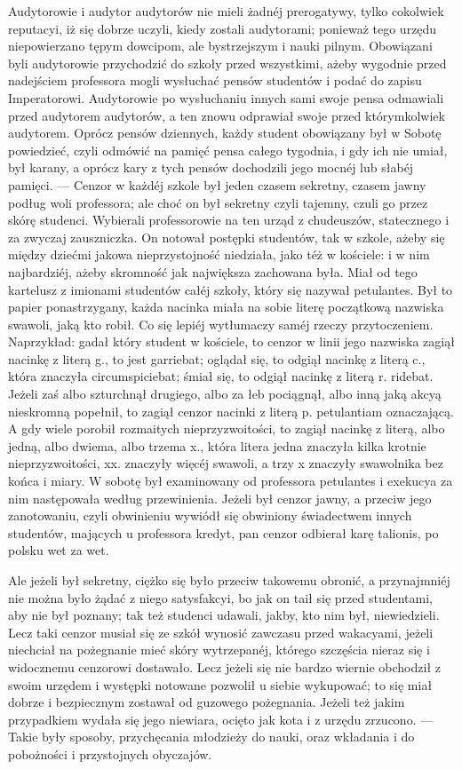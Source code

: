 \documentclass{book}
\begin{document}
Audytorowie i audytor audytorów nie mieli żadnéj prerogatywy, tylko cokolwiek reputacyi, iż się dobrze uczyli, kiedy zostali audytorami; ponieważ tego urzędu niepowierzano tępym dowcipom, ale bystrzejszym i nauki pilnym. Obowiązani byli audytorowie przychodzić do szkoły przed wszystkimi, ażeby wygodnie przed nadejściem professora mogli wysłuchać pensów studentów i podać do zapisu Imperatorowi. Audytorowie po wysłuchaniu innych sami swoje pensa odmawiali przed audytorem audytorów, a ten znowu odprawiał swoje przed którymkolwiek audytorem. Oprócz pensów dziennych, każdy student obowiązany był w Sobotę powiedzieć, czyli odmówić na pamięć pensa całego tygodnia, i gdy ich nie umiał, był karany, a oprócz kary z tych pensów dochodzili jego mocnéj lub słabéj pamięci. — Cenzor w każdéj szkole był jeden czasem sekretny, czasem jawny podług woli professora; ale choć on był sekretny czyli tajemny, czuli go przez skórę studenci. Wybierali professorowie na ten urząd z chudeuszów, statecznego i za zwyczaj zauszniczka. On notował postępki studentów, tak w szkole, ażeby się między dziećmi jakowa nieprzystojność niedziała, jako téż w kościele: i w nim najbardziéj, ażeby skromność jak największa zachowana była. Miał od tego kartelusz z imionami studentów całéj szkoły, który się nazywał petulantes. Był to papier ponastrzygany, każda nacinka miała na sobie literę początkową nazwiska swawoli, jaką kto robił. Co się lepiéj wytłumaczy saméj rzeczy przytoczeniem. Naprzykład: gadał który student w kościele, to cenzor w linii jego nazwiska zagiął nacinkę z literą g., to jest garriebat; oglądał się, to odgiął nacinkę z literą c., która znaczyła circumspiciebat; śmiał się, to odgiął nacinkę z literą r. ridebat. Jeżeli zaś albo szturchnął drugiego, albo za łeb pociągnął, albo inną jaką akcyą nieskromną popełnił, to zagiął cenzor nacinki z literą p. petulantiam oznaczającą. A gdy wiele porobił rozmaitych nieprzyzwoitości, to zagiął nacinkę z literą, albo jedną, albo dwiema, albo trzema x., która litera jedna znaczyła kilka krotnie nieprzyzwoitości, xx. znaczyły więcéj swawoli, a trzy x znaczyły swawolnika bez końca i miary. W sobotę był examinowany od professora petulantes i exekucya za nim następowała według przewinienia. Jeżeli był cenzor jawny, a przeciw jego zanotowaniu, czyli obwinieniu wywiódł się obwiniony świadectwem innych studentów, mających u professora kredyt, pan cenzor odbierał karę talionis, po polsku wet za wet.

Ale jeżeli był sekretny, ciężko się było przeciw takowemu obronić, a przynajmniéj nie można było żądać z niego satysfakcyi, bo jak on taił się przed studentami, aby nie był poznany; tak też studenci udawali, jakby, kto nim był, niewiedzieli. Lecz taki cenzor musiał się ze szkół wynosić zawczasu przed wakacyami, jeżeli niechciał na pożegnanie mieć skóry wytrzepanéj, którego szczęścia nieraz się i widocznemu cenzorowi dostawało. Lecz jeżeli się nie bardzo wiernie obchodził z swoim urzędem i występki notowane pozwolił u siebie wykupować; to się miał dobrze i bezpiecznym zostawał od guzowego pożegnania. Jeżeli też jakim przypadkiem wydała się jego niewiara, ocięto jak kota i z urzędu zrzucono. — Takie były sposoby, przychęcania młodzieży do nauki, oraz wkładania i do pobożności i przystojnych obyczajów.
\end{document}
